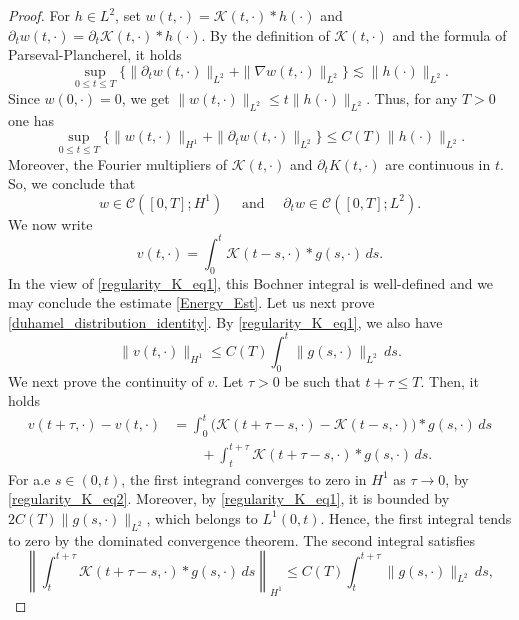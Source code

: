 \documentclass[10pt,a4paper]{amsart}
\begin{document}
	\begin{proof}
		For $h\in L^2$, set $w(t,\cdot)=\mathcal K(t,\cdot)\ast h(\cdot)$ and $\partial_tw(t,\cdot)=\partial_t\mathcal K(t,\cdot)\ast h(\cdot)$. By the definition of $\mathcal K(t,\cdot)$ and the formula of Parseval-Plancherel, it holds
		\begin{equation}\label{uniformbound_H_1_and_t}
			\sup_{0\leq t\leq T}\big\{\|\partial_tw(t,\cdot)\|_{L^2}+\|\nabla w(t,\cdot)\|_{L^2}\big\}\lesssim \|h(\cdot)\|_{L^2}.
		\end{equation}
		Since $w(0,\cdot)=0$, we get $\|w(t,\cdot)\|_{L^2}\leq t\|h(\cdot)\|_{L^2}$. Thus, for any $T>0$ one has
		\begin{equation}\label{regularity_K_eq1}
			\sup_{0\leq t\leq T}\big\{\|w(t,\cdot)\|_{H^1}+\|\partial_tw(t,\cdot)\|_{L^2}
			\big\}\leq C(T)\|h(\cdot)\|_{L^2}.
		\end{equation}
		Moreover, the Fourier multipliers of $\mathcal{K}(t,\cdot)$ and $\partial_t K(t,\cdot)$ are continuous in $t$. So, we conclude that
		\begin{equation}\label{regularity_K_eq2}
			w\in \mathcal{C}([0,T];H^1) \quad \text{ and }\quad
			\partial_tw \in \mathcal{C}([0,T];L^2).
		\end{equation}
		We now write
		\[
		v(t,\cdot)=\int_0^t\mathcal{K}(t-s,\cdot)\ast g(s,\cdot)\,ds.
		\]
		In the view of \eqref{regularity_K_eq1}, this Bochner integral is well-defined and we may conclude the estimate \eqref{Energy_Est}. Let us next prove \eqref{duhamel_distribution_identity}. By \eqref{regularity_K_eq1}, we also have
		\[
		\|v(t,\cdot)\|_{H^1}
		\leq C(T)\int_0^t \|g(s,\cdot)\|_{L^2}\,ds.
		\]
		We next prove the continuity of $v$. Let $\tau>0$ be such that $t+\tau\leq T$. Then, it holds
		\[
		\begin{aligned}
			v(t+\tau,\cdot)-v(t,\cdot) &=\int_0^t
			\bigl(\mathcal{K}(t+\tau-s,\cdot)-\mathcal{K}(t-s,\cdot)\bigr)\ast g(s,\cdot)\,ds \\
			&\qquad +\int_t^{t+\tau}\mathcal{K}(t+\tau-s,\cdot)\ast g(s,\cdot)\,ds.
		\end{aligned}
		\]
		For a.e $s\in(0,t)$, the first integrand converges to zero in $H^1$ as $\tau\to0$, by
		\eqref{regularity_K_eq2}. Moreover, by
		\eqref{regularity_K_eq1}, it is bounded by $2C(T)\|g(s,\cdot)\|_{L^2}$, which belongs to $L^1(0,t)$. Hence, the first integral tends to zero by the dominated convergence theorem. The second integral satisfies
		\[
		\left\|\int_t^{t+\tau}\mathcal{K}(t+\tau-s,\cdot)\ast g(s,\cdot)\,ds\right\|_{H^1}\leq C(T)\int_t^{t+\tau}\| g(s,\cdot)\|_{L^2}\,ds,
\]
\end{proof}
\end{document}
